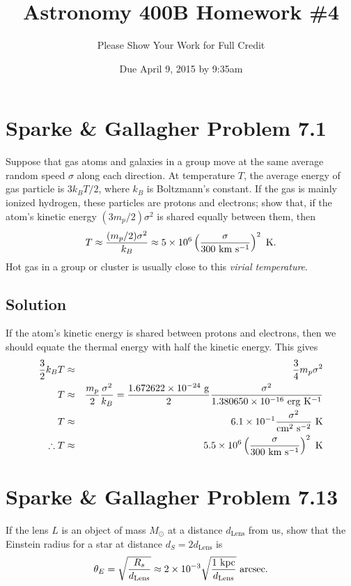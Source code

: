 \documentclass[]{article}
\title{Astronomy 400B Homework \#4}
\author{Please Show Your Work for Full Credit}
\date{Due April 9, 2015 by 9:35am}
\begin{document}
\maketitle

\section{Sparke \& Gallagher Problem 7.1}

Suppose that gas atoms and galaxies in a group move at the same average random speed $\sigma$ along each direction. At temperature $T$, the average energy of gas particle is $3k_B T/2$, where $k_B$ is Boltzmann's constant.  If the gas is mainly ionized hydrogen, these particles are protons and electrons; show that, if the atom's kinetic energy $(3 m_p/2)\sigma^2$ is shared equally
between them, then
\begin{equation}
T \approx \frac{(m_p/2)\sigma^2}{k_B} \approx 5 \times 10^6 \left( \frac{\sigma}{300~\mathrm{km}~\mathrm{s}^{-1}}\right)^2~\mathrm{K}.
\end{equation}
\noindent
Hot gas in a group or cluster is usually close to this {\it virial temperature}.

\subsection{Solution}

If the atom's kinetic energy is shared between protons and electrons, then we should equate the thermal energy with half the kinetic energy.  This gives
\begin{eqnarray}
\frac{3}{2} k_B T &\approx& \frac{3}{4} m_p \sigma^2 \\
T &\approx& \frac{m_p}{2} \frac{\sigma^2}{k_B} = \frac{1.672622\times10^{-24}~\mathrm{g}}{2} \frac{\sigma^2}{1.380650\times10^{-16}~\mathrm{erg}~\mathrm{K}^{-1}}\\
T &\approx& 6.1\times 10^{-1} \frac{\sigma^2}{\mathrm{cm}^2~\mathrm{s}^{-2}}~\mathrm{K} \\
\therefore T &\approx& 5.5 \times 10^{6} \left(\frac{\sigma}{300~\mathrm{km}~\mathrm{s}^{-1}}\right)^2~\mathrm{K}
\end{eqnarray}

\section{Sparke \& Gallagher Problem 7.13}

If the lens $L$ is an object of mass $M_{\odot}$ at a distance $d_{\mathrm{Lens}}$ from
us, show that the Einstein radius for a star at distance $d_S = 2 d_{\mathrm{Lens}}$ is
\begin{equation}
\theta_{E} = \sqrt{\frac{R_s}{d_{\mathrm{Lens}}}} \approx 2 \times 10^{-3} \sqrt{\frac{1~\mathrm{kpc}}{d_{\mathrm{Lens}}}}~\mathrm{arcsec}.
\end{equation}
\end{document}
